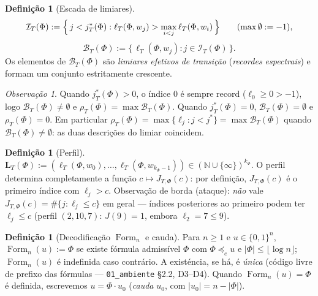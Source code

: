 \documentclass[11pt,a4paper]{article}
\theoremstyle{definition}
\newtheorem{definition}[theorem]{Definição}
\theoremstyle{remark}
\newtheorem*{remark}{Observação}
\newcommand{\Fm}{\operatorname{Form}}
\newcommand{\N}{\mathbb{N}}
\begin{document}
\begin{definition}[Escada de limiares]\label{def:BT}
\begin{equation}\label{eq:IT}
  \mathcal{I}_T(\Phi) := \Bigl\{\, j < j^{*}_{T}(\Phi) :
  \ell_T(\Phi,w_j) > \max_{i<j} \ell_T(\Phi,w_i) \,\Bigr\}
  \qquad (\max \emptyset := -1),
\end{equation}
\begin{equation}\label{eq:BT}
  \mathcal{B}_T(\Phi) := \bigl\{\, \ell_T(\Phi,w_j) : j \in \mathcal{I}_T(\Phi) \,\bigr\}.
\end{equation}
Os elementos de $\mathcal{B}_T(\Phi)$ são \emph{limiares efetivos de transição}
(\emph{recordes espectrais}) e formam um conjunto estritamente crescente.
\end{definition}

\begin{remark}
Quando $j^{*}_{T}(\Phi) > 0$, o índice $0$ é sempre record
($\ell_0 \geq 0 > -1$), logo $\mathcal{B}_T(\Phi) \neq \emptyset$ e
$\rho_T(\Phi) = \max \mathcal{B}_T(\Phi)$. Quando $j^{*}_{T}(\Phi) = 0$,
$\mathcal{B}_T(\Phi) = \emptyset$ e $\rho_T(\Phi) = 0$. Em particular
$\rho_T(\Phi) = \max\{ \ell_j : j < j^{*} \} = \max \mathcal{B}_T(\Phi)$
quando $\mathcal{B}_T(\Phi) \neq \emptyset$: as duas descrições do limiar
coincidem.
\end{remark}

\begin{definition}[Perfil]\label{def:perfil}
$\mathbf{L}_T(\Phi) := (\ell_T(\Phi,w_0), \dots, \ell_T(\Phi,w_{k_\Phi-1}))
\in (\N \cup \{\infty\})^{k_\Phi}$. O perfil determina completamente a função
$c \mapsto J_{T,\Phi}(c)$: por definição, $J_{T,\Phi}(c)$ é o primeiro índice
com $\ell_j > c$. Observação de borda (ataque): \emph{não} vale
$J_{T,\Phi}(c) = \#\{j : \ell_j \leq c\}$ em geral — índices posteriores ao
primeiro podem ter $\ell_j \leq c$ (perfil $(2,10,7)$: $J(9) = 1$, embora
$\ell_2 = 7 \leq 9$).
\end{definition}

\begin{definition}[Decodifica\c{c}\~{a}o $\Fm_n$ e cauda]\label{def:form}
Para $n \geq 1$ e $u \in \{0,1\}^n$, $\Fm_n(u) := \Phi$ se existe f\'{o}rmula
admiss\'{i}vel $\Phi$ com $\Phi \preceq_e u$ e $|\Phi| \leq \lfloor \log n
\rfloor$; $\Fm_n(u)$ \'{e} indefinida caso contr\'{a}rio. A exist\'{e}ncia, se
h\'{a}, \'{e} \emph{única} (c\'{o}digo livre de prefixo das f\'{o}rmulas —
\texttt{01\_ambiente} §2.2, D3--D4). Quando $\Fm_n(u) = \Phi$ \'{e} definida, escrevemos
$u = \Phi \cdot u_0$ (\emph{cauda} $u_0$, com $|u_0| = n - |\Phi|$).
\end{definition}
\end{document}
